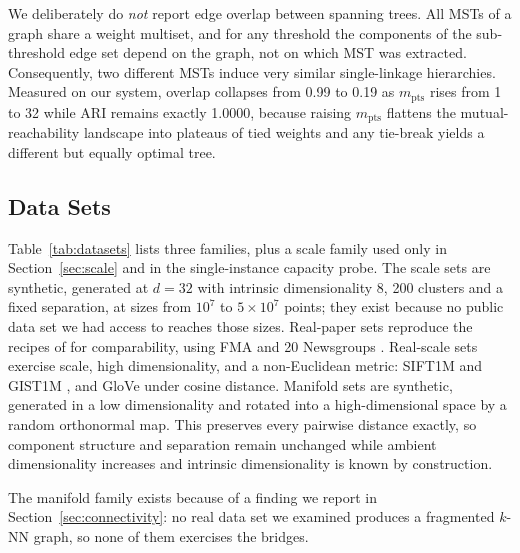 \documentclass{ieeeaccess}
\newcommand{\mpts}{m_{\mathrm{pts}}}
\begin{document}
We deliberately do \emph{not} report edge overlap between spanning trees. All
MSTs of a graph share a weight multiset, and for any threshold the components of
the sub-threshold edge set depend on the graph, not on which MST was extracted. Consequently, two different MSTs induce very similar single-linkage hierarchies.
Measured on our system, overlap collapses from 0.99 to 0.19 as $\mpts$ rises
from 1 to 32 while ARI remains exactly 1.0000, because raising $\mpts$ flattens
the mutual-reachability landscape into plateaus of tied weights and any
tie-break yields a different but equally optimal tree.

\subsection{Data Sets}

Table~\ref{tab:datasets} lists three families, plus a scale family used only
in Section~\ref{sec:scale} and in the single-instance capacity probe.
The scale sets are synthetic, generated at $d = 32$ with intrinsic
dimensionality 8, 200 clusters and a fixed separation, at sizes from $10^7$ to
$5\times10^7$ points; they exist because no public data set we had access to
reaches those sizes. Real-paper sets
reproduce the recipes of \cite{coresg} for comparability, using FMA \cite{fma}
and 20 Newsgroups \cite{newsgroups}. Real-scale sets exercise scale,
high dimensionality, and a non-Euclidean metric: SIFT1M and GIST1M
\cite{sift_gist}, and GloVe \cite{glove} under cosine distance.
Manifold sets are synthetic, generated in a low dimensionality and
rotated into a high-dimensional space by a random orthonormal map. This preserves every
pairwise distance exactly, so component structure and separation remain unchanged
while ambient dimensionality increases and intrinsic dimensionality is known by
construction.

The manifold family exists because of a finding we report in
Section~\ref{sec:connectivity}: no real data set we examined produces a
fragmented $k$-NN graph, so none of them exercises the bridges.
\end{document}
